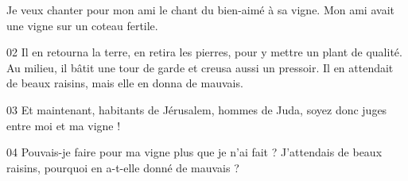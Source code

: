 Je veux chanter pour mon ami le chant du bien-aimé à sa vigne. Mon ami avait une vigne sur un coteau fertile.

02 Il en retourna la terre, en retira les pierres, pour y mettre un plant de qualité. Au milieu, il bâtit une tour de garde et creusa aussi un pressoir. Il en attendait de beaux raisins, mais elle en donna de mauvais.

03 Et maintenant, habitants de Jérusalem, hommes de Juda, soyez donc juges entre moi et ma vigne !

04 Pouvais-je faire pour ma vigne plus que je n’ai fait ? J’attendais de beaux raisins, pourquoi en a-t-elle donné de mauvais ?
